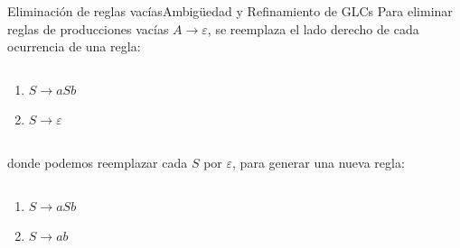 \documentclass[spanish]{beamer}
\begin{document}
\begin{frame}{Eliminación de reglas vacías}{Ambigüedad y Refinamiento de GLCs}
    Para eliminar reglas de producciones vacías $A \to \varepsilon$, se reemplaza el lado derecho de cada ocurrencia de una regla: \pause

    \bigskip

    \begin{columns}
        \begin{column}{0.5\textwidth}
            \begin{enumerate}
                \item $S \to aSb$
                \item $S \to \varepsilon$
            \end{enumerate} \pause
        \end{column}
        \begin{column}{0.5\textwidth}
        \end{column}
    \end{columns}

    \bigskip

    donde podemos reemplazar cada $S$ por $\varepsilon$, para generar una nueva regla: \pause

    \bigskip

    \begin{columns}
        \begin{column}{0.5\textwidth}
            \begin{enumerate}
                \item $S \to aSb$
                \item $S \to ab$
            \end{enumerate} \pause
        \end{column}
        \begin{column}{0.5\textwidth}
        \end{column}
    \end{columns}

    \bigskip




\end{frame}
\end{document}
